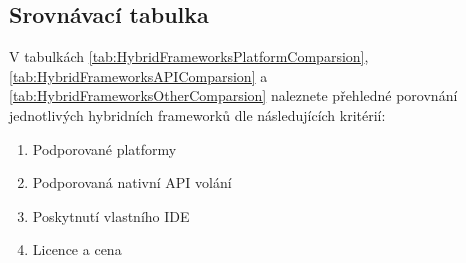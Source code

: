 \subsection{Srovnávací tabulka}
V tabulkách \ref{tab:HybridFrameworksPlatformComparsion}, \ref{tab:HybridFrameworksAPIComparsion} a \ref{tab:HybridFrameworksOtherComparsion} naleznete přehledné porovnání jednotlivých hybridních frameworků dle následujících kritérií:

\begin{enumerate}
	\item Podporované platformy
	\item Podporovaná nativní API volání
	\item Poskytnutí vlastního IDE
	\item Licence a cena
\end{enumerate}

